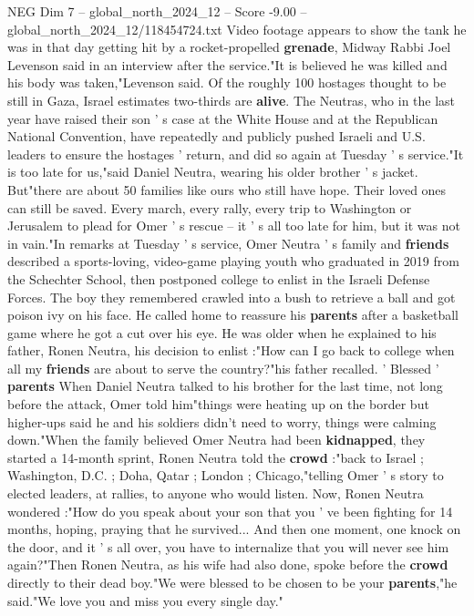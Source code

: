 \begin{textsample}{NEG Dim 7 – global\_north\_2024\_12 – Score -9.00 – global\_north\_2024\_12/118454724.txt}
Video footage appears to show the tank he was in that day getting hit by a rocket-propelled \textbf{grenade}, Midway Rabbi Joel Levenson said in an interview after the service."It is believed he was killed and his body was taken,"Levenson said.
Of the roughly 100 hostages thought to be still in Gaza, Israel estimates two-thirds are \textbf{alive}.
The Neutras, who in the last year have raised their son ' s case at the White House and at the Republican National Convention, have repeatedly and publicly pushed Israeli and U.S. leaders to ensure the hostages ' return, and did so again at Tuesday ' s service."It is too late for us,"said Daniel Neutra, wearing his older brother ' s jacket.
But"there are about 50 families like ours who still have hope.
Their loved ones can still be saved.
Every march, every rally, every trip to Washington or Jerusalem to plead for Omer ' s rescue -- it ' s all too late for him, but it was not in vain."In remarks at Tuesday ' s service, Omer Neutra ' s family and \textbf{friends} described a sports-loving, video-game playing youth who graduated in 2019 from the Schechter School, then postponed college to enlist in the Israeli Defense Forces.
The boy they remembered crawled into a bush to retrieve a ball and got poison ivy on his face.
He called home to reassure his \textbf{parents} after a basketball game where he got a cut over his eye.
He was older when he explained to his father, Ronen Neutra, his decision to enlist :"How can I go back to college when all my \textbf{friends} are about to serve the country?"his father recalled. ' Blessed ' \textbf{parents} When Daniel Neutra talked to his brother for the last time, not long before the attack, Omer told him"things were heating up on the border but higher-ups said he and his soldiers didn't need to worry, things were calming down."When the family believed Omer Neutra had been \textbf{kidnapped}, they started a 14-month sprint, Ronen Neutra told the \textbf{crowd} :"back to Israel ; Washington, D.C. ; Doha, Qatar ; London ; Chicago,"telling Omer ' s story to elected leaders, at rallies, to anyone who would listen.
Now, Ronen Neutra wondered :"How do you speak about your son that you ' ve been fighting for 14 months, hoping, praying that he survived...
And then one moment, one knock on the door, and it ' s all over, you have to internalize that you will never see him again?"Then Ronen Neutra, as his wife had also done, spoke before the \textbf{crowd} directly to their dead boy."We were blessed to be chosen to be your \textbf{parents},"he said."We love you and miss you every single day."

\end{textsample}
